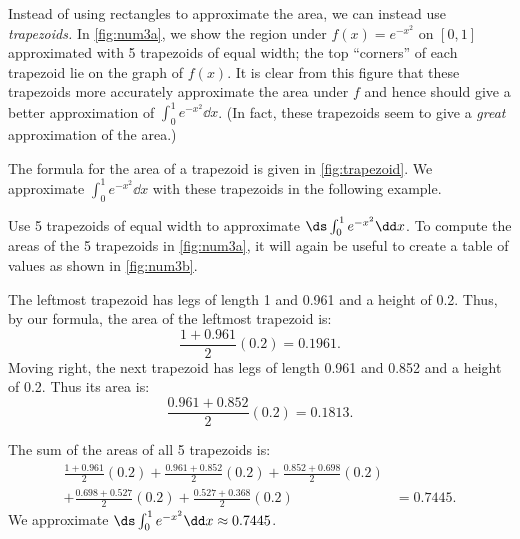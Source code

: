 Instead of using rectangles to approximate the area, we can instead use \emph{trapezoids.} In \autoref{fig:num3a}, we show the region under $f(x) = e^{-x^2}$ on $[0,1]$ approximated with 5 trapezoids of equal width; the top ``corners'' of each trapezoid lie on the graph of $f(x)$. It is clear from this figure that these trapezoids more accurately approximate the area under $f$ and hence should give a better approximation of $\int_0^1 e^{-x^2}\dd x$. (In fact, these trapezoids seem to give a \emph{great} approximation of the area.)



The formula for the area of a trapezoid is given in \autoref{fig:trapezoid}. We approximate $\int_0^1 e^{-x^2}\dd x$ with these trapezoids in the following example.

\begin{example}\label{ex_num3}%
Use 5 trapezoids of equal width to approximate $\ds \int_0^1e^{-x^2}\dd x$.
\solution
To compute the areas of the 5 trapezoids in \autoref{fig:num3a}, it will again be useful to create a table of values as shown in \autoref{fig:num3b}.


The leftmost trapezoid has legs of length 1 and 0.961 and a height of 0.2. Thus, by our formula, the area of the leftmost trapezoid is:
\[\frac{1+0.961}{2}(0.2) = 0.1961.\]
Moving right, the next trapezoid has legs of length 0.961 and 0.852 and a height of 0.2. Thus its area is:
\[\frac{0.961+0.852}2(0.2) = 0.1813.\]

The sum of the areas of all 5 trapezoids is:
\begin{align*}
\frac{1+0.961}{2}(0.2) + \frac{0.961+0.852}2(0.2)+\frac{0.852+0.698}2(0.2)& \\
+\frac{0.698+0.527}2(0.2)+\frac{0.527+0.368}2(0.2)&= 0.7445.
\end{align*}
We approximate $\ds \int_0^1 e^{-x^2}\dd x \approx 0.7445$.
\end{example}

